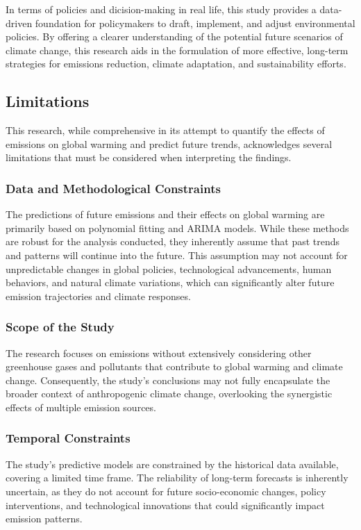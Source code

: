 \documentclass[12pt,a4paper]{article}
\begin{document}
    In terms of policies and dicision-making in real life, this study provides a data-driven foundation for policymakers to draft, implement, and adjust environmental policies. By offering a clearer understanding of the potential future scenarios of climate change, this research aids in the formulation of more effective, long-term strategies for emissions reduction, climate adaptation, and sustainability efforts.
    
    \subsection{Limitations}
    This research, while comprehensive in its attempt to quantify the effects of  emissions on global warming and predict future trends, acknowledges several limitations that must be considered when interpreting the findings.

    \subsubsection*{Data and Methodological Constraints}
    The predictions of future  emissions and their effects on global warming are primarily based on polynomial fitting and ARIMA models. While these methods are robust for the analysis conducted, they inherently assume that past trends and patterns will continue into the future. This assumption may not account for unpredictable changes in global policies, technological advancements, human behaviors, and natural climate variations, which can significantly alter future emission trajectories and climate responses.

    \subsubsection*{Scope of the Study}
    The research focuses on  emissions without extensively considering other greenhouse gases and pollutants that contribute to global warming and climate change. Consequently, the study's conclusions may not fully encapsulate the broader context of anthropogenic climate change, overlooking the synergistic effects of multiple emission sources.

    \subsubsection*{Temporal Constraints}
    The study's predictive models are constrained by the historical data available, covering a limited time frame. The reliability of long-term forecasts is inherently uncertain, as they do not account for future socio-economic changes, policy interventions, and technological innovations that could significantly impact  emission patterns.
    
\end{document}
